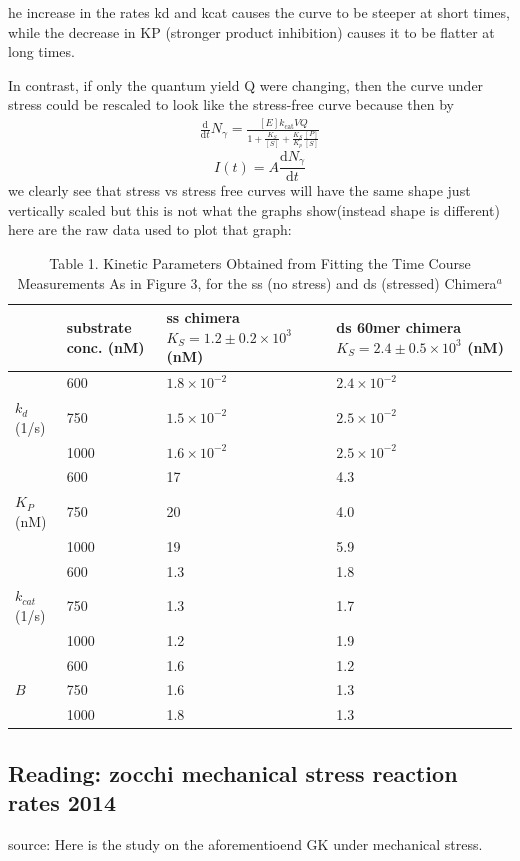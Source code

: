 \documentclass{article}
\begin{document}
\begin{proposition}
 he increase
in the rates kd and kcat causes the curve to be steeper at short times, while the decrease in KP (stronger product inhibition)  causes it to be ﬂatter at long times.
\end{proposition}
In contrast, if only the quantum yield Q were changing, then the curve under stress could be rescaled to look like the stress-free curve because then by
\begin{align*}
\frac{\mathrm{d}}{\mathrm{d}t}N_{\gamma} = \frac{[E]k_{\mathrm{cat}}VQ}{1 + \frac{K_S}{[S]} + \frac{K_S}{K_p} \frac{[P]}{[S]}}
\end{align*}
\[ I(t) = A \frac{\text{d}N_{\gamma}}{\text{d}t} \]
we clearly see that stress vs stress free curves will have the same shape just vertically scaled but this is not what the graphs show(instead shape is different)
here are the raw data used to plot that graph:
\begin{table}[H]\noindent\begin{tabularx}{\linewidth}{LLLL}
\hline
 & substrate conc. (nM) & ss chimera $K_S = 1.2 \pm 0.2 \times 10^3$ (nM) & ds 60mer chimera $K_S = 2.4 \pm 0.5 \times 10^3$ (nM) \\ \hline
 & 600 & $1.8 \times 10^{-2}$ & $2.4 \times 10^{-2}$ \\ \hline
$k_d$ (1/s) & 750 & $1.5 \times 10^{-2}$ & $2.5 \times 10^{-2}$ \\ \hline
 & 1000 & $1.6 \times 10^{-2}$ & $2.5 \times 10^{-2}$ \\ \hline
 & 600 & 17 & 4.3 \\ \hline
$K_P$ (nM) & 750 & 20 & 4.0 \\ \hline
 & 1000 & 19 & 5.9 \\ \hline
 & 600 & 1.3 & 1.8 \\ \hline
$k_{cat}$ (1/s) & 750 & 1.3 & 1.7 \\ \hline
 & 1000 & 1.2 & 1.9 \\ \hline
 & 600 & 1.6 & 1.2 \\ \hline
$B$ & 750 & 1.6 & 1.3 \\ \hline
 & 1000 & 1.8 & 1.3 \\ \hline
\end{tabularx}
\caption{Table 1. Kinetic Parameters Obtained from Fitting the Time Course Measurements As in Figure 3, for the ss (no stress) and ds (stressed) Chimera$^a$}
\end{table}

\subsection{Reading: zocchi mechanical stress reaction rates 2014}
source: \cite{josephAsymmetricEffectMechanical2014} 
Here is the study on the aforementioend GK under mechanical stress.
\end{document}
